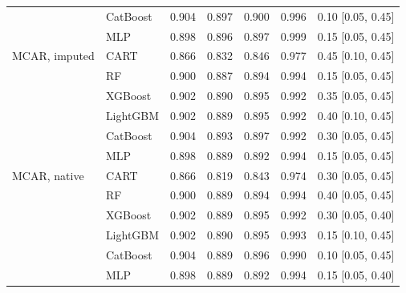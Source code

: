 \begin{table}[p]
\begin{tabular}{@{}llrrrrl@{}}
 & CatBoost & 0.904 & 0.897 & 0.900 & 0.996 & 0.10 [0.05, 0.45] \\
 & MLP & 0.898 & 0.896 & 0.897 & 0.999 & 0.15 [0.05, 0.45] \\
\midrule
MCAR, imputed & CART & 0.866 & 0.832 & 0.846 & 0.977 & 0.45 [0.10, 0.45] \\
 & RF & 0.900 & 0.887 & 0.894 & 0.994 & 0.15 [0.05, 0.45] \\
 & XGBoost & 0.902 & 0.890 & 0.895 & 0.992 & 0.35 [0.05, 0.45] \\
 & LightGBM & 0.902 & 0.889 & 0.895 & 0.992 & 0.40 [0.10, 0.45] \\
 & CatBoost & 0.904 & 0.893 & 0.897 & 0.992 & 0.30 [0.05, 0.45] \\
 & MLP & 0.898 & 0.889 & 0.892 & 0.994 & 0.15 [0.05, 0.45] \\
\midrule
MCAR, native & CART & 0.866 & 0.819 & 0.843 & 0.974 & 0.30 [0.05, 0.45] \\
 & RF & 0.900 & 0.889 & 0.894 & 0.994 & 0.40 [0.05, 0.45] \\
 & XGBoost & 0.902 & 0.889 & 0.895 & 0.992 & 0.30 [0.05, 0.40] \\
 & LightGBM & 0.902 & 0.890 & 0.895 & 0.993 & 0.15 [0.10, 0.45] \\
 & CatBoost & 0.904 & 0.889 & 0.896 & 0.990 & 0.10 [0.05, 0.45] \\
 & MLP & 0.898 & 0.889 & 0.892 & 0.994 & 0.15 [0.05, 0.40] \\
\bottomrule
\end{tabular}
\end{table}

